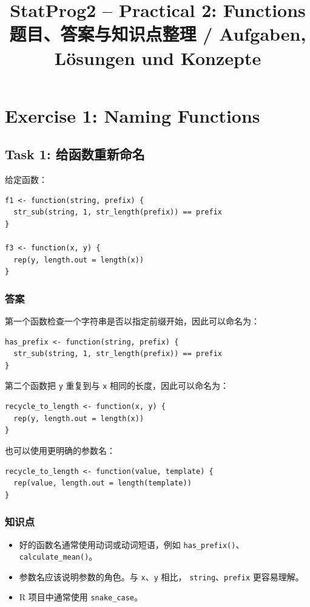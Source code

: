 \documentclass[11pt,a4paper]{ctexart}
\title{\textbf{StatProg2 -- Practical 2: Functions}\\
\large 题目、答案与知识点整理 / Aufgaben, Lösungen und Konzepte}
\author{}
\date{}
\begin{document}
\maketitle
\tableofcontents
\newpage

\section{Exercise 1: Naming Functions}

\subsection{Task 1: 给函数重新命名}

给定函数：

\begin{lstlisting}
f1 <- function(string, prefix) {
  str_sub(string, 1, str_length(prefix)) == prefix
}

f3 <- function(x, y) {
  rep(y, length.out = length(x))
}
\end{lstlisting}

\subsubsection*{答案}

第一个函数检查一个字符串是否以指定前缀开始，因此可以命名为：

\begin{lstlisting}
has_prefix <- function(string, prefix) {
  str_sub(string, 1, str_length(prefix)) == prefix
}
\end{lstlisting}

第二个函数把 \texttt{y} 重复到与 \texttt{x} 相同的长度，因此可以命名为：

\begin{lstlisting}
recycle_to_length <- function(x, y) {
  rep(y, length.out = length(x))
}
\end{lstlisting}

也可以使用更明确的参数名：

\begin{lstlisting}
recycle_to_length <- function(value, template) {
  rep(value, length.out = length(template))
}
\end{lstlisting}

\subsubsection*{知识点}

\begin{itemize}
  \item 好的函数名通常使用动词或动词短语，例如
  \texttt{has\_prefix()}、\texttt{calculate\_mean()}。
  \item 参数名应该说明参数的角色。与 \texttt{x}、\texttt{y} 相比，
  \texttt{string}、\texttt{prefix} 更容易理解。
  \item R 项目中通常使用 \texttt{snake\_case}。
\end{itemize}
\end{document}
